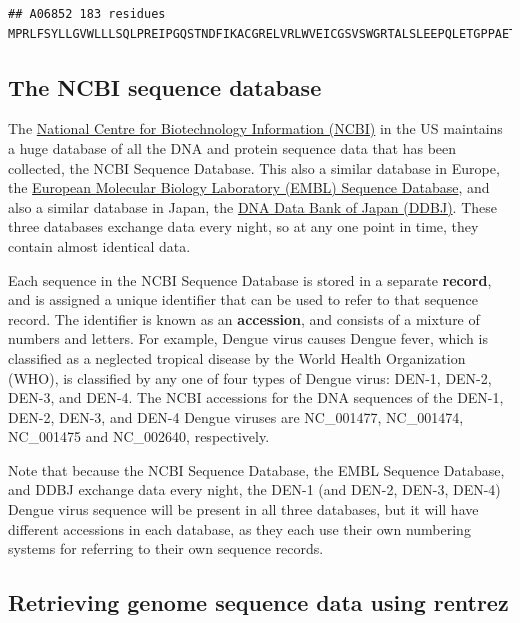 \documentclass[
]{book}
\begin{document}
\begin{verbatim}
## A06852 183 residues MPRLFSYLLGVWLLLSQLPREIPGQSTNDFIKACGRELVRLWVEICGSVSWGRTALSLEEPQLETGPPAETMPSSITKDAEILKMMLEFVPNLPQELKATLSERQPSLRELQQSASKDSNLNFEEFKKIILNRQNEAEDKSLLELKNLGLDKHSRKKRLFRMTLSEKCCQVGCIRKDIARLC
\end{verbatim}

\hypertarget{the-ncbi-sequence-database}{%
\subsection{The NCBI sequence database}\label{the-ncbi-sequence-database}}

The \href{www.ncbi.nlm.nih.gov}{National Centre for Biotechnology Information (NCBI)} in the US maintains a huge database of all the DNA and protein sequence data that has been collected, the NCBI Sequence Database. This also a similar database in Europe, the \href{www.ebi.ac.uk/embl}{European Molecular Biology Laboratory (EMBL) Sequence Database}, and also a similar database in Japan, the \href{www.ddbj.nig.ac.jp}{DNA Data Bank of Japan (DDBJ)}. These three databases exchange data every night, so at any one point in time, they contain almost identical data.

Each sequence in the NCBI Sequence Database is stored in a separate \textbf{record}, and is assigned a unique identifier that can be used to refer to that sequence record. The identifier is known as an \textbf{accession}, and consists of a mixture of numbers and letters. For example, Dengue virus causes Dengue fever, which is classified as a neglected tropical disease by the World Health Organization (WHO), is classified by any one of four types of Dengue virus: DEN-1, DEN-2, DEN-3, and DEN-4. The NCBI accessions for the DNA sequences of the DEN-1, DEN-2, DEN-3, and DEN-4 Dengue viruses are NC\_001477, NC\_001474, NC\_001475 and NC\_002640, respectively.

Note that because the NCBI Sequence Database, the EMBL Sequence Database, and DDBJ exchange data every night, the DEN-1 (and DEN-2, DEN-3, DEN-4) Dengue virus sequence will be present in all three databases, but it will have different accessions in each database, as they each use their own numbering systems for referring to their own sequence records.

\hypertarget{retrieving-genome-sequence-data-using-rentrez}{%
\subsection{Retrieving genome sequence data using rentrez}\label{retrieving-genome-sequence-data-using-rentrez}}
\end{document}
